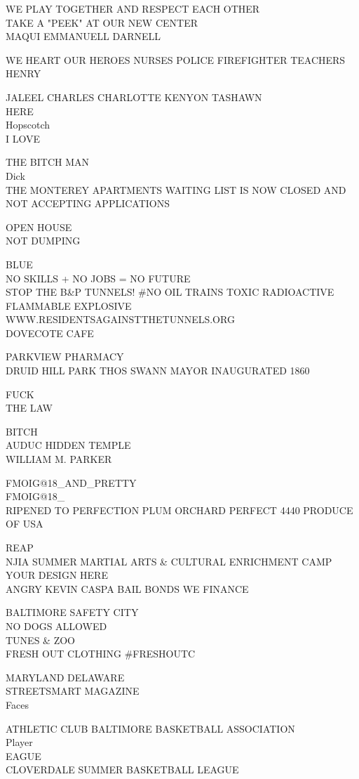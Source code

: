 \documentclass[10pt,letterpaper]{article}
\begin{document}
WE PLAY TOGETHER AND RESPECT EACH OTHER\\
TAKE A "PEEK" AT OUR NEW CENTER\\
MAQUI EMMANUELL DARNELL

WE HEART OUR HEROES NURSES POLICE FIREFIGHTER TEACHERS\\
HENRY

JALEEL CHARLES CHARLOTTE KENYON TASHAWN\\
HERE\\
Hopscotch\\
I LOVE

THE BITCH MAN\\
Dick\\
THE MONTEREY APARTMENTS WAITING LIST IS NOW CLOSED AND NOT ACCEPTING APPLICATIONS

OPEN HOUSE\\
NOT DUMPING

BLUE\\
NO SKILLS + NO JOBS = NO FUTURE\\
STOP THE B\&P TUNNELS!  \#NO OIL TRAINS TOXIC RADIOACTIVE FLAMMABLE EXPLOSIVE WWW.RESIDENTSAGAINSTTHETUNNELS.ORG\\
DOVECOTE CAFE

PARKVIEW PHARMACY\\
DRUID HILL PARK THOS SWANN MAYOR INAUGURATED 1860

FUCK\\
THE LAW

BITCH\\
AUDUC HIDDEN TEMPLE\\
WILLIAM M. PARKER

FMOIG@18\_AND\_PRETTY\\
FMOIG@18\_\\
RIPENED TO PERFECTION PLUM ORCHARD PERFECT 4440 PRODUCE OF USA

REAP\\
NJIA SUMMER MARTIAL ARTS \& CULTURAL ENRICHMENT CAMP\\
YOUR DESIGN HERE\\
ANGRY KEVIN CASPA BAIL BONDS WE FINANCE

BALTIMORE SAFETY CITY\\
NO DOGS ALLOWED\\
TUNES \& ZOO\\
FRESH OUT CLOTHING \#FRESHOUTC

MARYLAND DELAWARE\\
STREETSMART MAGAZINE\\
Faces

ATHLETIC CLUB BALTIMORE BASKETBALL ASSOCIATION\\
Player\\
EAGUE\\
CLOVERDALE SUMMER BASKETBALL LEAGUE
\end{document}
